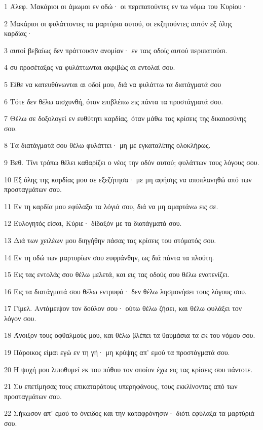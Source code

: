 \par 1 Άλεφ. Μακάριοι οι άμωμοι εν οδώ· οι περιπατούντες εν τω νόμω του Κυρίου·
\par 2 Μακάριοι οι φυλάττοντες τα μαρτύρια αυτού, οι εκζητούντες αυτόν εξ όλης καρδίας·
\par 3 αυτοί βεβαίως δεν πράττουσιν ανομίαν· εν ταις οδοίς αυτού περιπατούσι.
\par 4 συ προσέταξας να φυλάττωνται ακριβώς αι εντολαί σου.
\par 5 Είθε να κατευθύνωνται αι οδοί μου, διά να φυλάττω τα διατάγματά σου
\par 6 Τότε δεν θέλω αισχυνθή, όταν επιβλέπω εις πάντα τα προστάγματά σου.
\par 7 Θέλω σε δοξολογεί εν ευθύτητι καρδίας, όταν μάθω τας κρίσεις της δικαιοσύνης σου.
\par 8 Τα διατάγματά σου θέλω φυλάττει· μη με εγκαταλίπης ολοκλήρως.
\par 9 Βεθ. Τίνι τρόπω θέλει καθαρίζει ο νέος την οδόν αυτού; φυλάττων τους λόγους σου.
\par 10 Εξ όλης της καρδίας μου σε εξεζήτησα· με μη αφήσης να αποπλανηθώ από των προσταγμάτων σου.
\par 11 Εν τη καρδία μου εφύλαξα τα λόγιά σου, διά να μη αμαρτάνω εις σε.
\par 12 Ευλογητός είσαι, Κύριε· δίδαξόν με τα διατάγματά σου.
\par 13 Διά των χειλέων μου διηγήθην πάσας τας κρίσεις του στόματός σου.
\par 14 Εν τη οδώ των μαρτυρίων σου ευφράνθην, ως διά πάντα τα πλούτη.
\par 15 Εις τας εντολάς σου θέλω μελετά, και εις τας οδούς σου θέλω ενατενίζει.
\par 16 Εις τα διατάγματά σου θέλω εντρυφά· δεν θέλω λησμονήσει τους λόγους σου.
\par 17 Γίμελ. Αντάμειψον τον δούλον σου· ούτω θέλω ζήσει, και θέλω φυλάξει τον λόγον σου.
\par 18 Άνοιξον τους οφθαλμούς μου, και θέλω βλέπει τα θαυμάσια τα εκ του νόμου σου.
\par 19 Πάροικος είμαι εγώ εν τη γή· μη κρύψης απ' εμού τα προστάγματά σου.
\par 20 Η ψυχή μου λιποθυμεί εκ του πόθου τον οποίον έχω εις τας κρίσεις σου πάντοτε.
\par 21 Συ επετίμησας τους επικαταράτους υπερηφάνους, τους εκκλίνοντας από των προσταγμάτων σου.
\par 22 Σήκωσον απ' εμού το όνειδος και την καταφρόνησιν· διότι εφύλαξα τα μαρτύριά σου.
